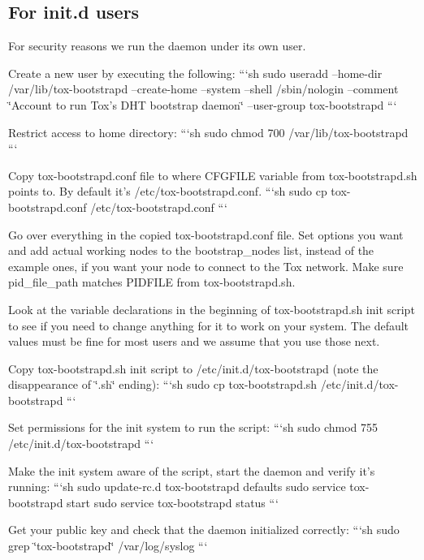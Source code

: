 \label{_initd}%
 \subsection*{For {\ttfamily init.\+d} users}

For security reasons we run the daemon under its own user.

Create a new user by executing the following\+: ```sh sudo useradd --home-\/dir /var/lib/tox-\/bootstrapd --create-\/home --system --shell /sbin/nologin --comment \char`\"{}\+Account to run Tox's D\+H\+T bootstrap daemon\char`\"{} --user-\/group tox-\/bootstrapd ```

Restrict access to home directory\+: ```sh sudo chmod 700 /var/lib/tox-\/bootstrapd ```

Copy {\ttfamily tox-\/bootstrapd.\+conf} file to where {\ttfamily C\+F\+G\+F\+I\+L\+E} variable from {\ttfamily tox-\/bootstrapd.\+sh} points to. By default it's {\ttfamily /etc/tox-\/bootstrapd.conf}. ```sh sudo cp tox-\/bootstrapd.\+conf /etc/tox-\/bootstrapd.conf ```

Go over everything in the copied {\ttfamily tox-\/bootstrapd.\+conf} file. Set options you want and add actual working nodes to the {\ttfamily bootstrap\+\_\+nodes} list, instead of the example ones, if you want your node to connect to the Tox network. Make sure {\ttfamily pid\+\_\+file\+\_\+path} matches {\ttfamily P\+I\+D\+F\+I\+L\+E} from {\ttfamily tox-\/bootstrapd.\+sh}.

Look at the variable declarations in the beginning of {\ttfamily tox-\/bootstrapd.\+sh} init script to see if you need to change anything for it to work on your system. The default values must be fine for most users and we assume that you use those next.

Copy {\ttfamily tox-\/bootstrapd.\+sh} init script to {\ttfamily /etc/init.d/tox-\/bootstrapd} (note the disappearance of \char`\"{}.\+sh\char`\"{} ending)\+: ```sh sudo cp tox-\/bootstrapd.\+sh /etc/init.d/tox-\/bootstrapd ```

Set permissions for the init system to run the script\+: ```sh sudo chmod 755 /etc/init.d/tox-\/bootstrapd ```

Make the init system aware of the script, start the daemon and verify it's running\+: ```sh sudo update-\/rc.\+d tox-\/bootstrapd defaults sudo service tox-\/bootstrapd start sudo service tox-\/bootstrapd status ```

Get your public key and check that the daemon initialized correctly\+: ```sh sudo grep \char`\"{}tox-\/bootstrapd\char`\"{} /var/log/syslog ```


